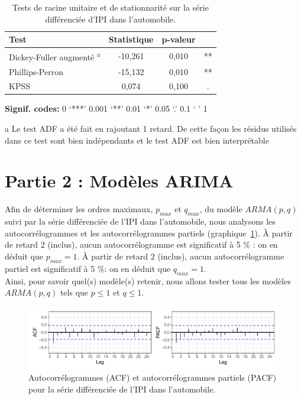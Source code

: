 \documentclass[french]{article}
\begin{document}
\begin{table}[!h]

\caption{\label{tab:tabTestsDiff}Tests de racine unitaire et de stationnarité sur la série différenciée d'IPI dans l'automobile.}
\centering
\begin{threeparttable}
\begin{tabular}[t]{lccc}
\toprule
Test & Statistique & p-valeur & \\
\midrule
Dickey-Fuller augmenté \textsuperscript{a} & -10,261 & 0,010 & **\\
Phillips-Perron & -15,132 & 0,010 & **\\
KPSS & 0,074 & 0,100 & .\\
\bottomrule
\end{tabular}
\begin{tablenotes}
\item \hspace{-0.4cm}\textbf{Signif. codes: }0 `***' 0.001 `**' 0.01 `*' 0.05 `.' 0.1 ` ' 1
\item[a] Le test ADF a été fait en rajoutant 1 retard. De cette façon les résidus utilisés dans ce test sont bien indépendants et le test ADF est bien interprétable
\end{tablenotes}
\end{threeparttable}
\end{table}

\hypertarget{partie-2-moduxe8les-arima}{%
\section{Partie 2 : Modèles ARIMA}\label{partie-2-moduxe8les-arima}}

Afin de déterminer les ordres maximaux, \(p_{max}\) et \(q_{max}\), du modèle \(ARMA(p,q)\) suivi par la série différenciée de l'IPI dans l'automobile, nous analysons les autocorrélogrammes et les autocorrélogrammes partiels (graphique~\ref{fig:acfPacf}).
À partir de retard 2 (inclus), aucun autocorrélogramme est significatif à 5 \% : on en déduit que \(p_{max} = 1\).
À partir de retard 2 (inclus), aucun autocorrélogramme partiel est significatif à 5 \%: on en déduit que \(q_{max} = 1\).\\
Ainsi, pour savoir quel(s) modèle(s) retenir, nous allons tester tous les modèles \(ARMA(p,q)\) tels que \(p\leq 1\) et \(q\leq 1\).

\begin{figure}

{\centering \includegraphics{img/rmd-acfPacf-1} 

}

\caption{Autocorrélogrammes (ACF) et autocorrélogrammes partiels (PACF) pour la série différenciée de l'IPI dans l'automobile.}\label{fig:acfPacf}
\end{figure}
\end{document}
